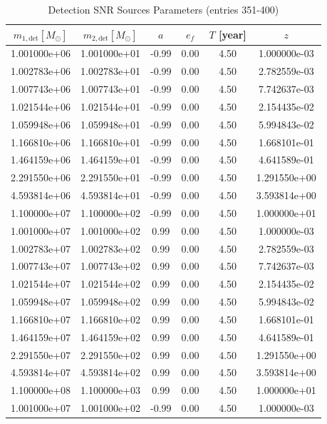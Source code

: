 \documentclass{article}
\begin{document}
\clearpage

\begin{table}[htbp]
\centering
\caption{Detection SNR Sources Parameters (entries 351-400)}
\label{tab:snr_sources_8}
\begin{tabular}{cccccc}
\hline
$m_{1,\mathrm{det}} [M_\odot]$ & $m_{2,\mathrm{det}} [M_\odot]$ & $a$ & $e_f$ & $T$ [year] & $z$ \\
\hline
1.001000e+06 & 1.001000e+01 & -0.99 & 0.00 & 4.50 & 1.000000e-03 \\
1.002783e+06 & 1.002783e+01 & -0.99 & 0.00 & 4.50 & 2.782559e-03 \\
1.007743e+06 & 1.007743e+01 & -0.99 & 0.00 & 4.50 & 7.742637e-03 \\
1.021544e+06 & 1.021544e+01 & -0.99 & 0.00 & 4.50 & 2.154435e-02 \\
1.059948e+06 & 1.059948e+01 & -0.99 & 0.00 & 4.50 & 5.994843e-02 \\
1.166810e+06 & 1.166810e+01 & -0.99 & 0.00 & 4.50 & 1.668101e-01 \\
1.464159e+06 & 1.464159e+01 & -0.99 & 0.00 & 4.50 & 4.641589e-01 \\
2.291550e+06 & 2.291550e+01 & -0.99 & 0.00 & 4.50 & 1.291550e+00 \\
4.593814e+06 & 4.593814e+01 & -0.99 & 0.00 & 4.50 & 3.593814e+00 \\
1.100000e+07 & 1.100000e+02 & -0.99 & 0.00 & 4.50 & 1.000000e+01 \\
1.001000e+07 & 1.001000e+02 & 0.99 & 0.00 & 4.50 & 1.000000e-03 \\
1.002783e+07 & 1.002783e+02 & 0.99 & 0.00 & 4.50 & 2.782559e-03 \\
1.007743e+07 & 1.007743e+02 & 0.99 & 0.00 & 4.50 & 7.742637e-03 \\
1.021544e+07 & 1.021544e+02 & 0.99 & 0.00 & 4.50 & 2.154435e-02 \\
1.059948e+07 & 1.059948e+02 & 0.99 & 0.00 & 4.50 & 5.994843e-02 \\
1.166810e+07 & 1.166810e+02 & 0.99 & 0.00 & 4.50 & 1.668101e-01 \\
1.464159e+07 & 1.464159e+02 & 0.99 & 0.00 & 4.50 & 4.641589e-01 \\
2.291550e+07 & 2.291550e+02 & 0.99 & 0.00 & 4.50 & 1.291550e+00 \\
4.593814e+07 & 4.593814e+02 & 0.99 & 0.00 & 4.50 & 3.593814e+00 \\
1.100000e+08 & 1.100000e+03 & 0.99 & 0.00 & 4.50 & 1.000000e+01 \\
1.001000e+07 & 1.001000e+02 & -0.99 & 0.00 & 4.50 & 1.000000e-03 \\

\end{tabular}
\end{table}
\end{document}
